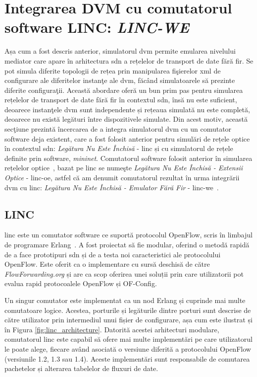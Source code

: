 \section{Integrarea DVM cu comutatorul software LINC: \textit{LINC-WE}}

Așa cum a fost descris anterior, simulatorul \gls{dvm} permite emularea nivelului mediator care apare în arhitectura \gls{sdn} a rețelelor de transport de date fără fir. Se pot simula diferite topologii de rețea prin manipularea fişierelor \gls{xml} de configurare ale diferitelor instanţe ale \gls{dvm}, făcând simulatoarele să prezinte diferite configuraţii. Această abordare oferă un bun prim pas pentru simularea rețelelor de transport de date fără fir în contextul \gls{sdn}, însă nu este suficient, deoarece instanţele \gls{dvm} sunt independente și rețeaua simulată nu este completă, deoarece nu există legături între dispozitivele simulate. Din acest motiv, această secţiune prezintă încercarea de a integra simulatorul \gls{dvm} cu un comutator software deja existent, care a fost folosit anterior pentru simulări de rețele optice în contextul \gls{sdn}: \textit{Legătura Nu Este Închisă} - \gls{linc} și cu simulatorul de rețele definite prin software, \textit{mininet}. Comutatorul software folosit anterior în simularea rețelelor optice~\cite{parulkar2015sdn, kretsis2016emulation, mehmeri2017software}, bazat pe \gls{linc} se numeşte \textit{Legătura Nu Este Închisă - Extensii Optice} - \gls{linc-oe}, astfel că am denumit comutatorul rezultat în urma integrării \gls{dvm} cu \gls{linc}: \textit{Legătura Nu Este Închisă - Emulator Fără Fir} - \gls{linc-we}~\cite{stancu2017wireless}.

\subsection{LINC}

\gls{linc} este un comutator software ce suportă protocolul OpenFlow, scris în limbajul de programare Erlang~\cite{lincsw}. A fost proiectat să fie modular, oferind o metodă rapidă de a face prototipuri \gls{sdn} și de a testa noi caracteristici ale protocolului OpenFlow. Este oferit ca o implementare cu sursă deschisă de către \textit{FlowForwarding.org} și are ca scop oferirea unei soluții prin care utilizatorii pot evalua rapid protocoalele OpenFlow și OF-Config.

Un singur comutator este implementat ca un nod Erlang și cuprinde mai multe comutatoare logice. Acestea, porturile și legăturile dintre porturi sunt descrise de către utilizator prin intermediul unui fișier de configurare, așa cum este ilustrat și în Figura \ref{fig:linc_architecture}. Datorită acestei arhitecturi modulare, comutatorul \gls{linc} este capabil să ofere mai multe implementări pe care utilizatorul le poate alege, fiecare având asociată o versiune diferită a protocolului OpenFlow (versiunile 1.2, 1.3 sau 1.4). Aceste implementări sunt responsabile de comutarea pachetelor și alterarea tabelelor de fluxuri de date.

